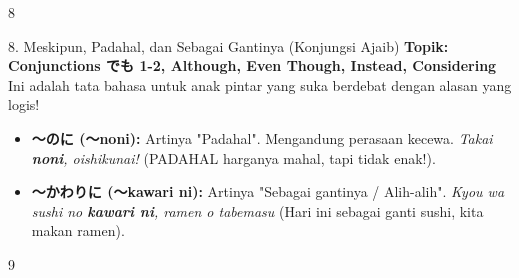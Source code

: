 \begin{convobox}{8}
    \noindent
      

    \vspace{1.5em}
\end{convobox}

\begin{lessonbox}{8. Meskipun, Padahal, dan Sebagai Gantinya (Konjungsi Ajaib)}
    \textbf{Topik: Conjunctions でも 1-2, Although, Even Though, Instead, Considering} \\
    Ini adalah tata bahasa untuk anak pintar yang suka berdebat dengan alasan yang logis!
    \begin{itemize}
        \item \textbf{〜のに (〜noni):} Artinya "Padahal". Mengandung perasaan kecewa. \textit{Takai \textbf{noni}, oishikunai!} (PADAHAL harganya mahal, tapi tidak enak!).
        \item \textbf{〜かわりに (〜kawari ni):} Artinya "Sebagai gantinya / Alih-alih". \textit{Kyou wa sushi no \textbf{kawari ni}, ramen o tabemasu} (Hari ini sebagai ganti sushi, kita makan ramen).
    \end{itemize}
\end{lessonbox}

\begin{convobox}{9}
    \noindent
      

    \vspace{1.5em}
\end{convobox}

